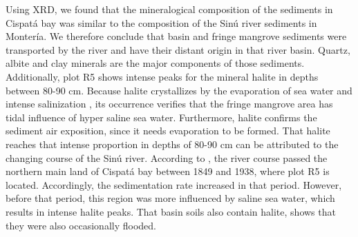 Using XRD, we found that the mineralogical composition of the sediments in Cispat\'{a} bay was similar to the composition of the Sin\'{u} river sediments in Monter\'{i}a. We therefore conclude that basin and fringe mangrove sediments were transported by the river and have their distant origin in that river basin. Quartz, albite and clay minerals are the major components of those sediments. Additionally, plot R5 shows intense peaks for the mineral halite in depths between 80-90 cm. 
Because halite crystallizes by the evaporation of sea water and intense salinization \citep{McCaffrey}, its occurrence verifies that the fringe mangrove area has tidal influence of hyper saline sea water. Furthermore, halite confirms the sediment air exposition, since it needs evaporation to be formed. That halite reaches that intense proportion in depths of 80-90 cm can be attributed to the changing course of the Sin\'{u} river. According to \citet{suarez2004}, the river course passed the northern main land of Cispat\'{a} bay between 1849 and 1938, where plot R5 is located. Accordingly, the sedimentation rate increased in that period. However, before that period, this region was more influenced by saline sea water, which results in intense halite peaks. That basin soils also contain halite, shows that they were also occasionally  flooded. \par


